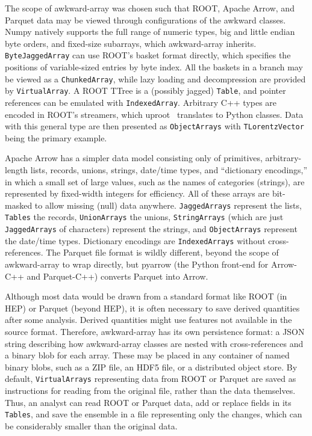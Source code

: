 \documentclass{webofc}
\begin{document}
The scope of awkward-array was chosen such that ROOT, Apache Arrow, and Parquet data may be viewed through configurations of the awkward classes. Numpy natively supports the full range of numeric types, big and little endian byte orders, and fixed-size subarrays, which awkward-array inherits. {\tt\small ByteJaggedArray} can use ROOT's basket format directly, which specifies the positions of variable-sized entries by byte index. All the baskets in a branch may be viewed as a {\tt\small ChunkedArray}, while lazy loading and decompression are provided by {\tt\small VirtualArray}. A ROOT TTree is a (possibly jagged) {\tt\small Table}, and pointer references can be emulated with {\tt\small IndexedArray}. Arbitrary C++ types are encoded in ROOT's streamers, which uproot~\cite{uproot} translates to Python classes. Data with this general type are then presented as {\tt\small ObjectArrays} with {\tt\small TLorentzVector} being the primary example.

Apache Arrow has a simpler data model consisting only of primitives, arbitrary-length lists, records, unions, strings, date/time types, and ``dictionary encodings,'' in which a small set of large values, such as the names of categories (strings), are represented by fixed-width integers for efficiency. All of these arrays are bit-masked to allow missing (null) data anywhere. {\tt\small JaggedArrays} represent the lists, {\tt\small Tables} the records, {\tt\small UnionArrays} the unions, {\tt\small StringArrays} (which are just {\tt\small JaggedArrays} of characters) represent the strings, and {\tt\small ObjectArrays} represent the date/time types. Dictionary encodings are {\tt\small IndexedArrays} without cross-references. The Parquet file format is wildly different, beyond the scope of awkward-array to wrap directly, but pyarrow (the Python front-end for Arrow-C++ and Parquet-C++) converts Parquet into Arrow.

Although most data would be drawn from a standard format like ROOT (in HEP) or Parquet (beyond HEP), it is often necessary to save derived quantities after some analysis. Derived quantities might use features not available in the source format. Therefore, awkward-array has its own persistence format: a JSON string describing how awkward-array classes are nested with cross-references and a binary blob for each array. These may be placed in any container of named binary blobs, such as a ZIP file, an HDF5 file, or a distributed object store. By default, {\tt\small VirtualArrays} representing data from ROOT or Parquet are saved as instructions for reading from the original file, rather than the data themselves. Thus, an analyst can read ROOT or Parquet data, add or replace fields in its {\tt\small Tables}, and save the ensemble in a file representing only the changes, which can be considerably smaller than the original data.
\end{document}
